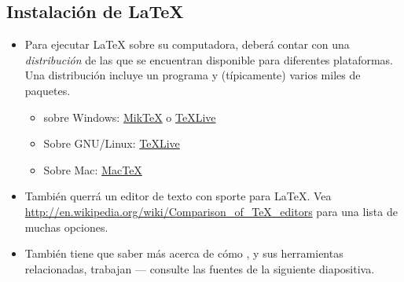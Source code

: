 \documentclass{beamer}
\begin{document}
\subsection{Instalación de  \LaTeX{}}
\begin{frame}{\insertsubsection}
  \begin{itemize}
  \item Para ejecutar \LaTeX{} sobre su computadora, deberá contar con
    una \emph{distribución} de las que se encuentran disponible para
    diferentes plataformas. Una distribución incluye un programa
     y (típicamente) varios miles de paquetes.
    \begin{itemize}
    \item sobre Windows: \href{http://miktex.org/}{Mik\TeX} o \href{http://tug.org/texlive/}{\TeX Live}
    \item Sobre GNU/Linux: \href{http://tug.org/texlive/}{\TeX Live}
    \item Sobre Mac: \href{http://tug.org/mactex/}{Mac\TeX}
    \end{itemize}
  \item También querrá un editor de texto con sporte para
\LaTeX{}. Vea
\url{http://en.wikipedia.org/wiki/Comparison_of_TeX_editors} para una
lista de muchas opciones.
  \item También tiene que saber más acerca de cómo  , y sus
    herramientas relacionadas, trabajan --- consulte las fuentes de la
    siguiente diapositiva. 
  \end{itemize}
\end{frame}

\end{document}
